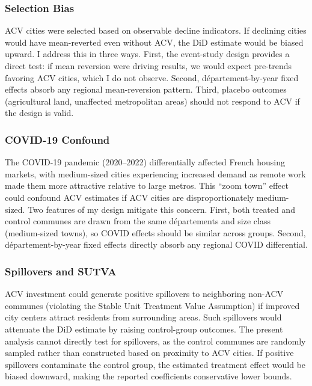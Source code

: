 \documentclass[12pt]{article}
\begin{document}
\subsubsection{Selection Bias}

ACV cities were selected based on observable decline indicators. If declining cities would have mean-reverted even without ACV, the DiD estimate would be biased upward. I address this in three ways. First, the event-study design provides a direct test: if mean reversion were driving results, we would expect pre-trends favoring ACV cities, which I do not observe. Second, d\'{e}partement-by-year fixed effects absorb any regional mean-reversion pattern. Third, placebo outcomes (agricultural land, unaffected metropolitan areas) should not respond to ACV if the design is valid.

\subsubsection{COVID-19 Confound}

The COVID-19 pandemic (2020--2022) differentially affected French housing markets, with medium-sized cities experiencing increased demand as remote work made them more attractive relative to large metros. This ``zoom town'' effect could confound ACV estimates if ACV cities are disproportionately medium-sized. Two features of my design mitigate this concern. First, both treated and control communes are drawn from the same d\'{e}partements and size class (medium-sized towns), so COVID effects should be similar across groups. Second, d\'{e}partement-by-year fixed effects directly absorb any regional COVID differential.

\subsubsection{Spillovers and SUTVA}

ACV investment could generate positive spillovers to neighboring non-ACV communes (violating the Stable Unit Treatment Value Assumption) if improved city centers attract residents from surrounding areas. Such spillovers would attenuate the DiD estimate by raising control-group outcomes. The present analysis cannot directly test for spillovers, as the control communes are randomly sampled rather than constructed based on proximity to ACV cities. If positive spillovers contaminate the control group, the estimated treatment effect would be biased downward, making the reported coefficients conservative lower bounds.
\end{document}

